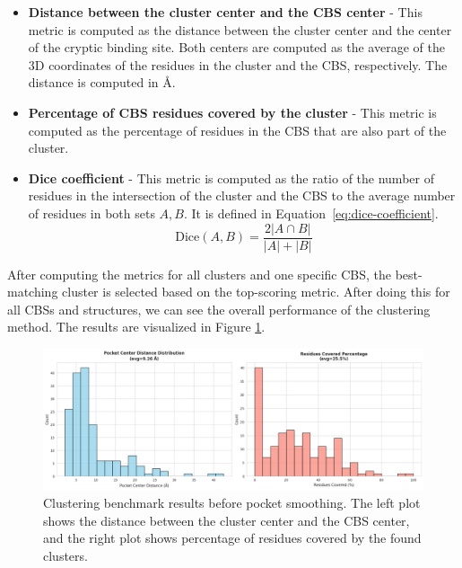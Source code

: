 \begin{itemize}
    \item \textbf{Distance between the cluster center and the CBS center} - This metric is computed as the distance between the cluster center and the center of the cryptic binding site. Both centers are computed as the average of the 3D coordinates of the residues in the cluster and the CBS, respectively. The distance is computed in \AA.
    \item \textbf{Percentage of CBS residues covered by the cluster} - This metric is computed as the percentage of residues in the CBS that are also part of the cluster.
    \item \textbf{Dice coefficient} - This metric is computed as the ratio of the number of residues in the intersection of the cluster and the CBS to the average number of residues in both sets $A, B$. It is defined in Equation~\ref{eq:dice-coefficient}.
    \begin{equation}
        \text{Dice}(A, B) = \frac{2 |A \cap B|}{|A| + |B|}
        \label{eq:dice-coefficient}
    \end{equation}
\end{itemize}

After computing the metrics for all clusters and one specific CBS, the best-matching cluster is selected based on the top-scoring metric. After doing this for all CBSs and structures, we can see the overall performance of the clustering method. The results are visualized in Figure \ref{fig:clustering-benchmark}.

\begin{figure}[htbp]
    \centering
    \includegraphics[width=\textwidth]{img/non-smoothened-1.png}
    \caption{Clustering benchmark results before pocket smoothing. The left plot shows the distance between the cluster center and the CBS center, and the right plot shows percentage of residues covered by the found clusters.}
    \label{fig:clustering-benchmark}
\end{figure}

